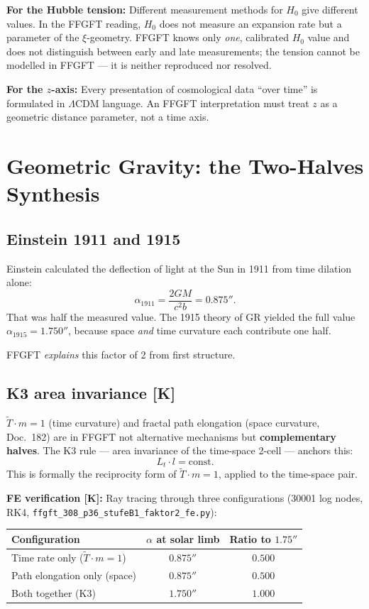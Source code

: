 \textbf{For the Hubble tension:} Different measurement methods for $H_0$
give different values. In the FFGFT reading, $H_0$ does not measure an
expansion rate but a parameter of the $\xi$-geometry. FFGFT knows only
\emph{one}, calibrated $H_0$ value and does not distinguish between early and
late measurements; the tension cannot be modelled in FFGFT --- it is
neither reproduced nor resolved.

\textbf{For the $z$-axis:} Every presentation of cosmological data ``over
time'' is formulated in $\Lambda$CDM language. An FFGFT interpretation must
treat $z$ as a geometric distance parameter, not a time axis.

\chapter{Geometric Gravity: the Two-Halves Synthesis}

\section{Einstein 1911 and 1915}

Einstein calculated the deflection of light at the Sun in 1911 from time
dilation alone:
\[
  \alpha_{1911} = \frac{2GM}{c^2 b} = 0.875'' .
\]
That was half the measured value. The 1915 theory of GR yielded the full
value $\alpha_{1915} = 1.750''$, because space \emph{and} time curvature
each contribute one half.

FFGFT \emph{explains} this factor of 2 from first structure.

\section{K3 area invariance [K]}

$\tilde T \cdot m = 1$ (time curvature) and fractal path elongation (space
curvature, Doc.~182) are in FFGFT not alternative mechanisms but
\textbf{complementary halves}. The K3 rule — area invariance of the
time-space 2-cell — anchors this:
\[
  L_t \cdot l = \text{const.}
\]
This is formally the reciprocity form of $\tilde T \cdot m = 1$, applied
to the time-space pair.

\textbf{FE verification [K]:} Ray tracing through three configurations
(30001 log nodes, RK4,
\texttt{ffgft\_308\_p36\_stufeB1\_faktor2\_fe.py}):

\begin{center}
\begin{tabular}{lcc}
\toprule
Configuration & $\alpha$ at solar limb & Ratio to $1.75''$\\
\midrule
Time rate only ($\tilde T \cdot m = 1$) & $0.875''$ & $0.500$\\
Path elongation only (space)            & $0.875''$ & $0.500$\\
Both together (K3)                      & $1.750''$ & $1.000$\\
\bottomrule
\end{tabular}
\end{center}

